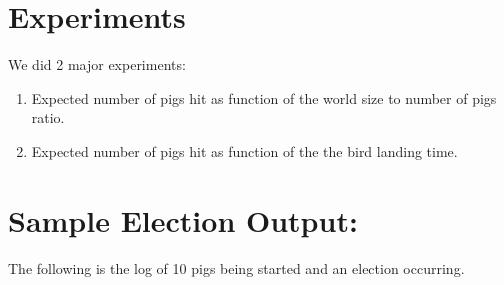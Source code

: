 \documentclass[]{article}
\begin{document}
\section{Experiments}
We did 2 major experiments:
\begin{enumerate}[1.]
\item
  Expected number of pigs hit as function of the world size to number of pigs ratio.
\item
  Expected number of pigs hit as function of the the bird landing time.
\end{enumerate} 

\section{Sample Election Output:}

The following is the log of 10 pigs being started and an election occurring.
\end{document}
